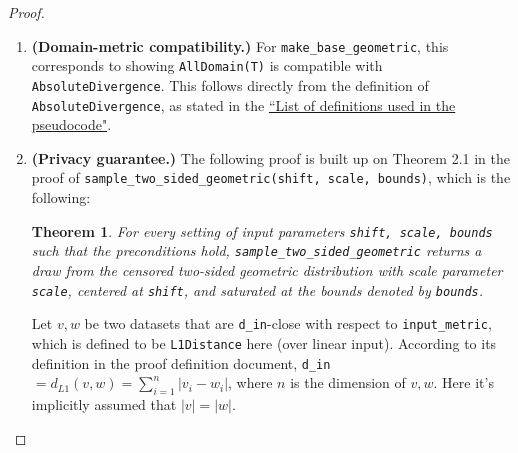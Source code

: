 \documentclass[11pt,a4paper]{article}
\newtheorem{theorem}{Theorem}[section]
\newtheorem{lemma}[theorem]{Lemma}
\newcommand{\vicki}[1]{{ {\color{olive}{(vicki)~#1}}}}
\newcommand{\hanwen}[1]{{ {\color{purple}{(hanwen)~#1}}}}
\begin{document}
\begin{proof}
\begin{enumerate}
    \item \textbf{(Domain-metric compatibility.)} For \texttt{make\_base\_geometric}, this corresponds to showing \texttt{AllDomain(T)} is compatible with \texttt{AbsoluteDivergence}. This follows directly from the definition of \texttt{AbsoluteDivergence}, as stated in the \href{https://github.com/opendp/whitepapers/blob/pseudocode-defns/pseudocode-defns/pseudocode_defns.pdf}{``List of definitions used in the pseudocode"}.
    \item \textbf{(Privacy guarantee.)} 
    The following proof is built up on Theorem 2.1 in the proof
    of \texttt{sample\_two\_sided\_geometric(shift, scale, bounds)}, which is the following: \hanwen{link to be put here}
    
    \begin{tcolorbox}
    \begin{theorem}
     For every setting of input parameters \texttt{shift, scale, bounds} such that the preconditions hold, \texttt{sample\_two\_sided\_geometric} returns a draw from the censored two-sided geometric distribution with scale parameter \texttt{scale}, centered at \texttt{shift}, and saturated at the bounds denoted by \texttt{bounds}. 
    \end{theorem}

    \end{tcolorbox}
    Let $v,w$ be two datasets that are \texttt{d\_in}-close with respect to \texttt{input\_metric}, which is defined to be
    \texttt{L1Distance} here (over linear input). According to its definition 
    in the proof definition document, \texttt{d\_in}$=d_{L1}(v,w)=\sum ^n_{i=1}|v_i-w_i|$,
    where $n$ is the dimension of $v,w$.
    Here it's implicitly assumed that $|v|=|w|$.
    

\end{enumerate}
\end{proof}
\end{document}
